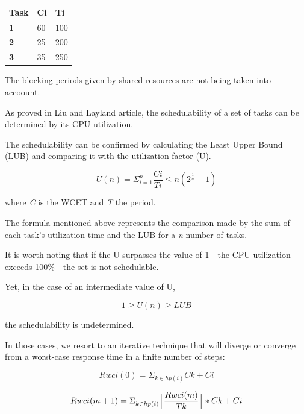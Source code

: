 \documentclass[11pt]{article}
\begin{document}
\begin{table}[H]
\begin{tabular}{lll}
\textbf{Task} & \textbf{Ci} & \textbf{Ti} \\
\textbf{1}    & 60         & 100           \\
\textbf{2}    & 25         & 200           \\
\textbf{3}    & 35         & 250          
\end{tabular}
\end{table}

The blocking periods given by shared resources are not being taken into accoount.

As proved in Liu and Layland \cite{liulayland} article, the schedulability of a set of tasks can be determined by its CPU utilization.

The schedulability can be confirmed by calculating the Least Upper Bound (LUB) and comparing it with the utilization factor (U).

\begin{equation} 
	U(n) = \Sigma_{i=1}^n \frac{Ci}{Ti} \leq n(2^ \frac{1}{n} - 1)
\end{equation}

{\small where \emph{C} is the WCET and \emph{T} the period.}
\medskip
\medskip

The formula mentioned above represents the comparison made by the sum of each task's utilization time and the LUB for a \emph{n} number of tasks. 

It is worth noting that if the U surpasses the value of 1 - the CPU utilization exceeds 100\% - the set is not schedulable.

Yet, in the case of an intermediate value of U,

\begin{equation} 
	1 \geq U(n) \geq LUB
\end{equation}

the schedulability is undetermined.
\medskip

In those cases, we resort to an iterative technique that will diverge or converge from a worst-case response time in a finite number of steps:

\begin{equation} 
	Rwci(0) = \Sigma_{k\in hp(i)}^{} Ck + Ci
\end{equation}

\begin{equation} \label{lub}
	Rwci(m+1) = \Sigma_{k\in hp(i)}^{}  \Bigl\lceil\dfrac{Rwci(m)}{Tk}\Bigr\rceil * Ck + Ci
\end{equation}
\end{document}
